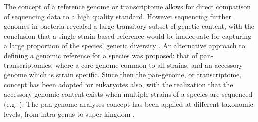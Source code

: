 \documentclass[12pt]{article}
\begin{document}
The concept of a reference genome or transcriptome allows for direct comparison of sequencing data to a high quality standard. 
However sequencing further genomes in bacteria revealed a large transitory subset of genetic content, with the conclusion that a single strain-based reference would be inadequate for capturing a large proportion of the species' genetic diversity \cite{tettelin2005genome,vernikos2015ten}. 
An alternative approach to defining a genomic reference for a species was proposed: that of pan-transcriptomics, where a core genome common to all strains, and an accessory genome which is strain specific. 
Since then the pan-genome, or transcriptome, concept has been adopted for eukaryotes also, with the realization that the accessory genomic content exists when multiple strains of a species are sequenced (e.g.  \cite{jin2016maize,plissonneau2018pangenome,read2013pan,li2014novo,song2015agape,posnien2014comprehensive}).  
The pan-genome analyses concept has been applied at different taxonomic levels, from intra-genus to super kingdom  \cite{lapierre2009estimating,he2016pan,koid2014comparative,jin2016maize,vernikos2015ten}. 

\end{document}
